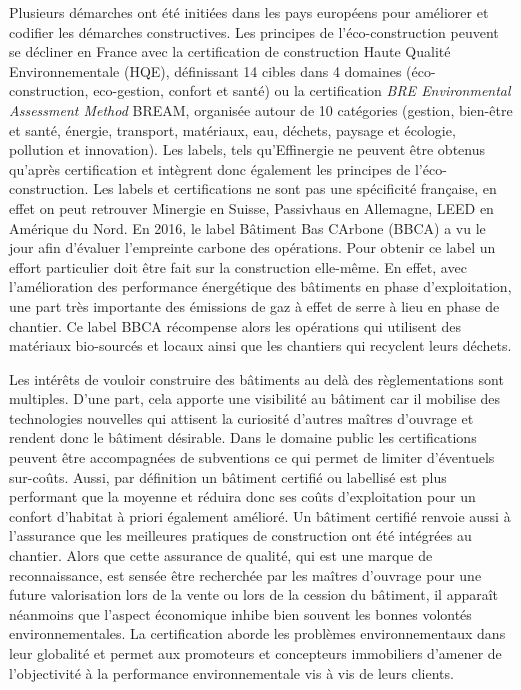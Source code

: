 Plusieurs démarches ont été initiées dans les pays européens pour améliorer et codifier les démarches constructives. Les principes de l'éco-construction peuvent se décliner en France avec la certification de construction Haute Qualité Environnementale (HQE), définissant 14 cibles dans 4 domaines (éco-construction, eco-gestion, confort et santé) ou la certification \textit{BRE Environmental Assessment Method} BREAM, organisée autour de 10 catégories (gestion, bien-être et santé, énergie, transport, matériaux, eau, déchets, paysage et écologie, pollution et innovation). Les labels, tels qu'Effinergie ne peuvent être obtenus qu'après certification et intègrent donc également les principes de l'éco-construction. Les labels et certifications ne sont pas une spécificité française, en effet on peut retrouver Minergie en Suisse, Passivhaus en Allemagne, LEED en Amérique du Nord. En 2016, le label Bâtiment Bas CArbone (BBCA) a vu le jour afin d'évaluer l'empreinte carbone des opérations. Pour obtenir ce label un effort particulier doit être fait sur la construction elle-même. En effet, avec l'amélioration des performance énergétique des bâtiments en phase d'exploitation, une part très importante des émissions de gaz à effet de serre à lieu en phase de chantier. Ce label BBCA récompense alors les opérations qui utilisent des matériaux bio-sourcés et locaux ainsi que les chantiers qui recyclent leurs déchets.

Les intérêts de vouloir construire des bâtiments au delà des règlementations sont multiples. D'une part, cela apporte une visibilité au bâtiment car il mobilise des technologies nouvelles qui attisent la curiosité d'autres maîtres d'ouvrage et rendent donc le bâtiment désirable. Dans le domaine public les certifications peuvent être accompagnées de subventions ce qui permet de limiter d'éventuels sur-coûts. Aussi, par définition un bâtiment certifié ou labellisé est plus performant que la moyenne et réduira donc ses coûts d'exploitation pour un confort d'habitat à priori également amélioré. Un bâtiment certifié renvoie aussi à l'assurance que les meilleures pratiques de construction ont été intégrées au chantier. Alors que cette assurance de qualité, qui est une marque de reconnaissance, est sensée être recherchée par les maîtres d'ouvrage pour une future valorisation lors de la vente ou lors de la cession du bâtiment, il apparaît néanmoins que l'aspect économique inhibe bien souvent les bonnes volontés environnementales. La certification aborde les problèmes environnementaux dans leur globalité et permet aux promoteurs et concepteurs immobiliers d'amener de l'objectivité à la performance environnementale vis à vis de leurs clients.

